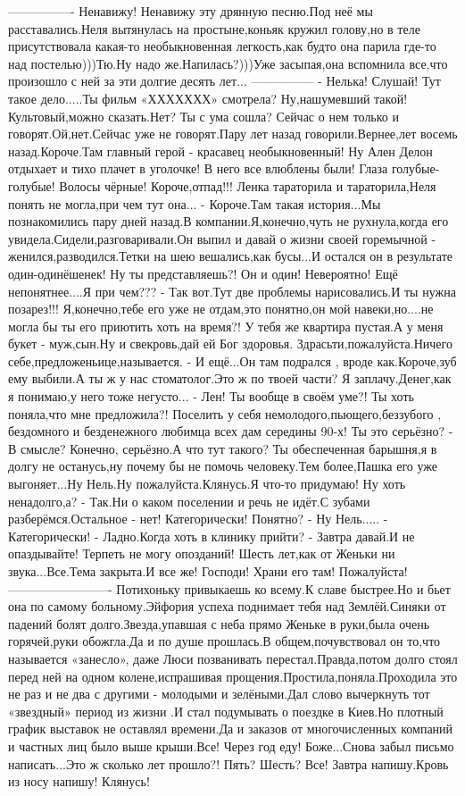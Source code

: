 —————-
Ненавижу! Ненавижу эту дрянную песню.Под неё мы расставались.Неля вытянулась на простыне,коньяк кружил голову,но в теле присутствовала какая-то необыкновенная легкость,как будто она парила где-то над постелью)))Тю.Ну надо же.Напилась?)))Уже засыпая,она вспомнила все,что произошло с ней за эти долгие десять лет...
—————
- Нелька! Слушай! Тут такое дело.....Ты фильм «ХХХХХХХ» смотрела? Ну,нашумевший такой! Культовый,можно сказать.Нет? Ты с ума сошла? Сейчас о нем только и говорят.Ой,нет.Сейчас уже не говорят.Пару лет назад говорили.Вернее,лет восемь назад.Короче.Там главный герой - красавец необыкновенный! Ну Ален Делон отдыхает и тихо плачет в уголочке! В него все влюблены были! Глаза голубые-голубые! Волосы чёрные! Короче,отпад!!!
Ленка тараторила и тараторила,Неля понять не могла,при чем тут она...
- Короче.Там такая история...Мы познакомились пару дней назад.В компании.Я,конечно,чуть не рухнула,когда его увидела.Сидели,разговаривали.Он выпил и давай о жизни своей горемычной - женился,разводился.Тетки на шею вешались,как бусы...И остался он в результате один-одинёшенек! Ну ты представляешь?! Он и один! Невероятно! 
Ещё непонятнее....Я при чем???
- Так вот.Тут две проблемы нарисовались.И ты нужна позарез!!! Я,конечно,тебе его уже не отдам,это понятно,он мой навеки,но....не могла бы ты его приютить хоть на время?! У тебя же квартира пустая.А у меня букет - муж,сын.Ну и свекровь,дай ей Бог здоровья.
Здрасьти,пожалуйста.Ничего себе,предложеньице,называется.
- И ещё...Он там подрался , вроде как.Короче,зуб ему выбили.А ты ж у нас стоматолог.Это ж по твоей части? Я заплачу.Денег,как я понимаю,у него тоже негусто...
- Лен! Ты вообще в своём уме?! Ты хоть поняла,что мне предложила?! Поселить у себя немолодого,пьющего,беззубого , бездомного и безденежного любимца всех дам середины 90-х! Ты это серьёзно? 
- В смысле? Конечно, серьёзно.А что тут такого? Ты обеспеченная барышня,я в долгу не останусь,ну почему бы не помочь человеку.Тем более,Пашка его уже выгоняет...Ну Нель.Ну пожалуйста.Клянусь.Я что-то придумаю! Ну хоть ненадолго,а? 
- Так.Ни о каком поселении и речь не идёт.С зубами разберёмся.Остальное - нет! Категорически! Понятно?
- Ну Нель.....
- Категорически! 
- Ладно.Когда хоть в клинику прийти?
- Завтра давай.И не опаздывайте! Терпеть не могу опозданий!
Шесть лет,как от Женьки ни звука...Все.Тема закрыта.И все же! Господи! Храни его там! Пожалуйста! 
————————-
Потихоньку привыкаешь ко всему.К славе быстрее.Но и бьет она по самому больному.Эйфория успеха поднимает тебя над Землёй.Синяки от падений болят долго.Звезда,упавшая с неба прямо Женьке в руки,была очень горячей,руки обожгла.Да и по душе прошлась.В общем,почувствовал он то,что называется «занесло», даже Люси позванивать перестал.Правда,потом долго стоял перед ней на одном колене,испрашивая прощения.Простила,поняла.Проходила это не раз и не два с другими - молодыми и зелёными.Дал слово вычеркнуть тот «звездный» период из жизни .И стал подумывать о поездке в Киев.Но плотный график выставок не оставлял времени.Да и заказов от многочисленных компаний и частных лиц было выше крыши.Все! Через год еду! Боже...Снова забыл письмо написать...Это ж сколько лет прошло?! Пять? Шесть? Все! Завтра напишу.Кровь из носу напишу! Клянусь!
